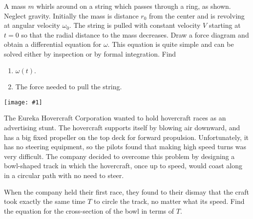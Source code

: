 \documentclass[12pt,letterpaper]{hmcpset}
\newcommand{\diagram}[1]{\begin{center}\texttt{[image: \#1]}\end{center}}
\begin{document}
\begin{solution}
    \vfill
\end{solution}
\newpage

\begin{problem}
    A mass $m$ whirls around on a string
    which passes through a ring, as shown.
    Neglect gravity. Initially the mass
    is distance $r_{0}$ from the center and
    is revolving at angular velocity $\omega_{0}$.
    The string is pulled with constant velocity
    $V$ starting at $t = 0$ so that the radial
    distance to the mass decreases. Draw a force
    diagram and obtain a differential equation for
    $\omega$. This equation is quite simple and
    can be solved either by inspection
    or by formal integration. Find

    \begin{enumerate}
    \item $\omega(t)$.
    \item The force needed to pull the string.
    \end{enumerate}

    \diagram{img/3_22.png}
\end{problem}

\begin{solution}
    \vfill
\end{solution}
\newpage

\begin{problem}[5 - Hovercraft - KK 3.25]
The Eureka Hovercraft Corporation wanted
to hold hovercraft races as an advertising
stunt. The hovercraft supports itself
by blowing air downward, and has a big
fixed propeller on the top deck for forward
propulsion. Unfortunately, it has no
steering equipment, so the pilots found that
making high speed turns was very difficult.
The company decided to overcome this problem
by designing a bowl-shaped track in which the
hovercraft, once up to speed, would coast
along in a circular path with no need to steer.

When the company held their first race, they
found to their dismay that the craft took
exactly the same time $T$ to circle the track,
no matter what its speed. Find the equation
for the cross-section of the bowl in terms of $T$.
\end{problem}

\begin{solution}
    \vfill
\end{solution}
\newpage
\end{document}
